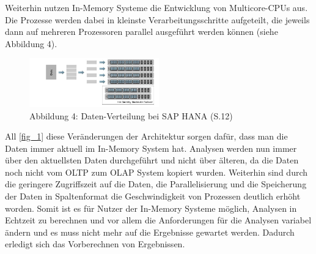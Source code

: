 Weiterhin nutzen In-Memory Systeme die Entwicklung von Multicore-CPUs aus. Die Prozesse werden dabei in kleinste Verarbeitungsschritte aufgeteilt, die jeweils dann auf mehreren Prozessoren parallel ausgeführt werden können (siehe Abbildung 4).\\
\begin{figure}[ht]
  \begin{center}
  \includegraphics[width=0.5\textwidth]{images/data.png}
  \end{center}
  \caption{Abbildung 4: Daten-Verteilung bei SAP HANA (\cite{sap}S.12)}
  \label{fig_4}
\end{figure} 
All \ref{fig_1} diese Veränderungen der Architektur sorgen dafür, dass man die Daten immer 
aktuell im In-Memory System hat. Analysen werden nun immer über 
den aktuellsten Daten durchgeführt und nicht über älteren, da die Daten noch nicht vom OLTP zum OLAP System kopiert wurden. Weiterhin sind durch die geringere Zugriffszeit auf die Daten, die Parallelisierung und die Speicherung der Daten in Spaltenformat die Geschwindigkeit von Prozessen deutlich erhöht worden. Somit ist es für Nutzer der In-Memory Systeme möglich, Analysen in Echtzeit zu berechnen und vor allem die Anforderungen für die Analysen variabel ändern und es muss nicht mehr auf die Ergebnisse gewartet werden. Dadurch erledigt sich das Vorberechnen von Ergebnissen.
\\
